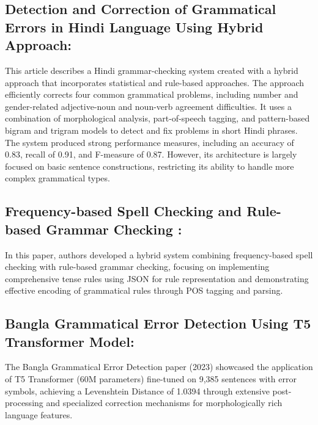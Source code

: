 \documentclass[11pt,a4paper]{article}
\begin{document}
\subsection{Detection and Correction of Grammatical Errors in Hindi Language Using Hybrid Approach:} 

This article describes a Hindi grammar-checking system created with a hybrid approach that incorporates statistical and rule-based approaches. The approach efficiently corrects four common grammatical problems, including number and gender-related adjective-noun and noun-verb agreement difficulties. It uses a combination of morphological analysis, part-of-speech tagging, and pattern-based bigram and trigram models to detect and fix problems in short Hindi phrases. The system produced strong performance measures, including an accuracy of 0.83, recall of 0.91, and F-measure of 0.87. However, its architecture is largely focused on basic sentence constructions, restricting its ability to handle more complex grammatical types. \cite{mittal_detection_2019}

\subsection{Frequency-based Spell Checking and
Rule-based Grammar Checking :}
 In this paper, authors developed a hybrid system combining frequency-based spell checking with rule-based grammar checking, focusing on implementing comprehensive tense rules using JSON for rule representation and demonstrating effective encoding of grammatical rules through POS tagging and parsing.
 \cite{singh2016frequency}

 \subsection{Bangla Grammatical Error Detection Using T5
 Transformer Model:}
 The Bangla Grammatical Error Detection paper (2023) 
 showcased the application of T5 Transformer (60M parameters) 
 fine-tuned on 9,385 sentences with error symbols, achieving a Levenshtein Distance of 1.0394 through extensive post-processing and specialized correction mechanisms for morphologically rich language features. \cite{shahgir2023bangla}\\
\end{document}
